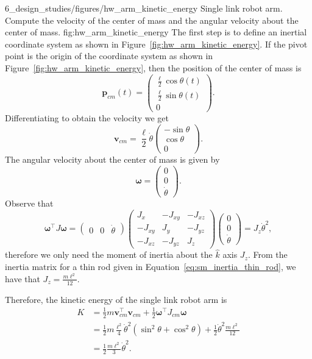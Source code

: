 
	{6_design_studies/figures/hw_arm_kinetic_energy} 
	{Single link robot arm.  Compute the velocity of the center of mass and the angular velocity about the center of mass.}
	{fig:hw_arm_kinetic_energy}
The first step is to define an inertial coordinate system as shown in Figure~\ref{fig:hw_arm_kinetic_energy}.  If the pivot point is the origin of the coordinate system as shown in Figure~\ref{fig:hw_arm_kinetic_energy}, then the position of the center of mass is 
\[
\mathbf{p}_{cm}(t) = \begin{pmatrix} \frac{\ell}{2}\cos\theta(t) \\ \frac{\ell}{2}\sin\theta(t) \\ 0 \end{pmatrix}.
\]
Differentiating to obtain the velocity we get
\[
\mathbf{v}_{cm} = \frac{\ell}{2}\dot{\theta} \begin{pmatrix} -\sin\theta \\ \cos\theta \\ 0 \end{pmatrix}.
\]
The angular velocity about the center of mass is given by
\[
\boldsymbol{\omega} = \begin{pmatrix} 0 \\ 0 \\ \dot{\theta} \end{pmatrix}.
\]
Observe that 
\[
\boldsymbol{\omega}^\top J \boldsymbol{\omega} = \begin{pmatrix} 0 & 0 & \dot{\theta}\end{pmatrix} 
\begin{pmatrix} J_x & -J_{xy} & -J_{xz} \\ -J_{xy} & J_y & -J_{yz} \\ -J_{xz} & -J_{yz} & J_z \end{pmatrix} 
\begin{pmatrix} 0 \\ 0 \\ \dot{\theta} \end{pmatrix} = J_z \dot{\theta}^2,
\]
therefore we only need the moment of inertia about the $\hat{k}$ axis $J_z$. From the inertia matrix for a thin rod given in Equation~\eqref{eq:sm_inertia_thin_rod}, we have that $J_z=\frac{m\ell^2}{12}$.

Therefore, the kinetic energy of the single link robot arm is 
\begin{align*}
K &= \frac{1}{2} m \mathbf{v}_{cm}^\top \mathbf{v}_{cm} + \frac{1}{2}\boldsymbol{\omega}^\top J_{cm} \boldsymbol{\omega} \\
  &= \frac{1}{2} m \frac{\ell^2}{4}\dot{\theta}^2(\sin^2\theta + \cos^2\theta) + \frac{1}{2}\dot{\theta}^2\frac{m\ell^2}{12} \\
  &=\frac{1}{2}\frac{m\ell^2}{3}\dot{\theta}^2.
\end{align*}





